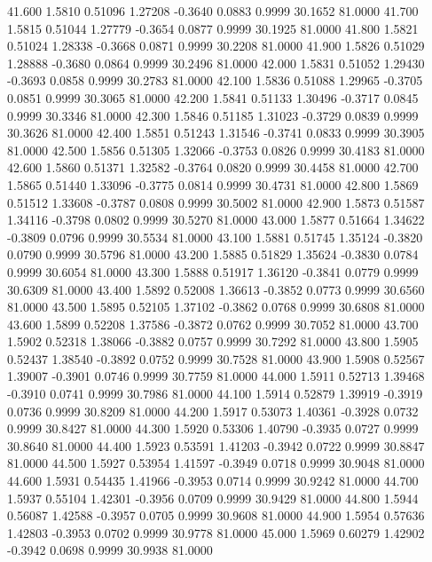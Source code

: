   41.600   1.5810   0.51096   1.27208  -0.3640   0.0883   0.9999  30.1652  81.0000
  41.700   1.5815   0.51044   1.27779  -0.3654   0.0877   0.9999  30.1925  81.0000
  41.800   1.5821   0.51024   1.28338  -0.3668   0.0871   0.9999  30.2208  81.0000
  41.900   1.5826   0.51029   1.28888  -0.3680   0.0864   0.9999  30.2496  81.0000
  42.000   1.5831   0.51052   1.29430  -0.3693   0.0858   0.9999  30.2783  81.0000
  42.100   1.5836   0.51088   1.29965  -0.3705   0.0851   0.9999  30.3065  81.0000
  42.200   1.5841   0.51133   1.30496  -0.3717   0.0845   0.9999  30.3346  81.0000
  42.300   1.5846   0.51185   1.31023  -0.3729   0.0839   0.9999  30.3626  81.0000
  42.400   1.5851   0.51243   1.31546  -0.3741   0.0833   0.9999  30.3905  81.0000
  42.500   1.5856   0.51305   1.32066  -0.3753   0.0826   0.9999  30.4183  81.0000
  42.600   1.5860   0.51371   1.32582  -0.3764   0.0820   0.9999  30.4458  81.0000
  42.700   1.5865   0.51440   1.33096  -0.3775   0.0814   0.9999  30.4731  81.0000
  42.800   1.5869   0.51512   1.33608  -0.3787   0.0808   0.9999  30.5002  81.0000
  42.900   1.5873   0.51587   1.34116  -0.3798   0.0802   0.9999  30.5270  81.0000
  43.000   1.5877   0.51664   1.34622  -0.3809   0.0796   0.9999  30.5534  81.0000
  43.100   1.5881   0.51745   1.35124  -0.3820   0.0790   0.9999  30.5796  81.0000
  43.200   1.5885   0.51829   1.35624  -0.3830   0.0784   0.9999  30.6054  81.0000
  43.300   1.5888   0.51917   1.36120  -0.3841   0.0779   0.9999  30.6309  81.0000
  43.400   1.5892   0.52008   1.36613  -0.3852   0.0773   0.9999  30.6560  81.0000
  43.500   1.5895   0.52105   1.37102  -0.3862   0.0768   0.9999  30.6808  81.0000
  43.600   1.5899   0.52208   1.37586  -0.3872   0.0762   0.9999  30.7052  81.0000
  43.700   1.5902   0.52318   1.38066  -0.3882   0.0757   0.9999  30.7292  81.0000
  43.800   1.5905   0.52437   1.38540  -0.3892   0.0752   0.9999  30.7528  81.0000
  43.900   1.5908   0.52567   1.39007  -0.3901   0.0746   0.9999  30.7759  81.0000
  44.000   1.5911   0.52713   1.39468  -0.3910   0.0741   0.9999  30.7986  81.0000
  44.100   1.5914   0.52879   1.39919  -0.3919   0.0736   0.9999  30.8209  81.0000
  44.200   1.5917   0.53073   1.40361  -0.3928   0.0732   0.9999  30.8427  81.0000
  44.300   1.5920   0.53306   1.40790  -0.3935   0.0727   0.9999  30.8640  81.0000
  44.400   1.5923   0.53591   1.41203  -0.3942   0.0722   0.9999  30.8847  81.0000
  44.500   1.5927   0.53954   1.41597  -0.3949   0.0718   0.9999  30.9048  81.0000
  44.600   1.5931   0.54435   1.41966  -0.3953   0.0714   0.9999  30.9242  81.0000
  44.700   1.5937   0.55104   1.42301  -0.3956   0.0709   0.9999  30.9429  81.0000
  44.800   1.5944   0.56087   1.42588  -0.3957   0.0705   0.9999  30.9608  81.0000
  44.900   1.5954   0.57636   1.42803  -0.3953   0.0702   0.9999  30.9778  81.0000
  45.000   1.5969   0.60279   1.42902  -0.3942   0.0698   0.9999  30.9938  81.0000
